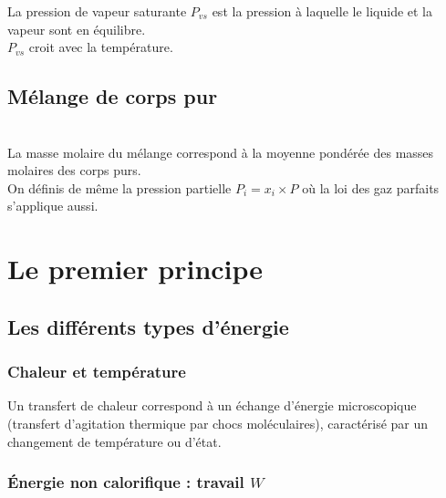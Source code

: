 \documentclass[13pt, twoside, a4paper, french]{report}
\begin{document}
                \vspace{-7pt}
                La pression de vapeur saturante $P_{vs}$ est la pression à laquelle le liquide et la vapeur sont en équilibre.\\
                $P_{vs}$ croit avec la température.


        \section{Mélange de corps pur}\label{sec:melange-de-corps-pur}

            \vspace{5pt}\\
            La masse molaire du mélange correspond à la moyenne pondérée des masses molaires des corps purs.\\
            On définis de même la pression partielle $P_i = x_i \times P$ où la loi des gaz parfaits s'applique aussi.


    \chapter{Le premier principe}\label{ch:le-premier-principe-de-la-thermodynamique}


        \section{Les différents types d’énergie}\label{sec:les-differents-types-denergie}

            \subsection{Chaleur et température}\label{subsec:chaleur-et-temperature}

                Un transfert de chaleur correspond à un échange d'énergie microscopique (transfert d'agitation thermique par chocs moléculaires), caractérisé par un changement de température ou d'état.

            \subsection{Énergie non calorifique : travail $W$}\label{subsec:energie-non-calorifique}
\end{document}
